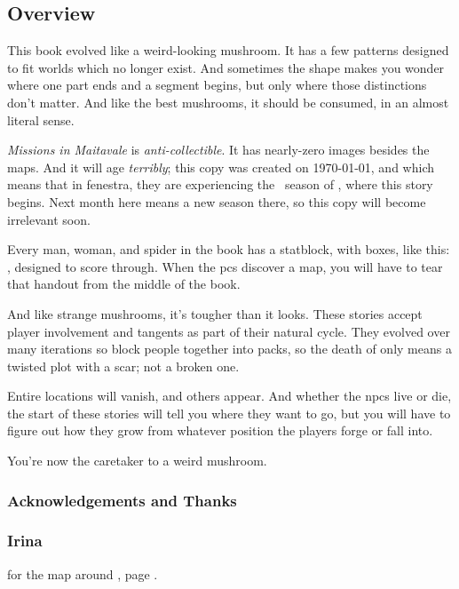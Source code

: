 \subsection*{Overview}

\begin{multicols}{2}

This book evolved like a weird-looking mushroom.
It has a few patterns designed to fit worlds which no longer exist.
And sometimes the shape makes you wonder where one part ends and a segment begins, but only where those distinctions don't matter.
And like the best mushrooms, it should be consumed, in an almost literal sense.

\textit{Missions in Maitavale} is \emph{anti-collectible}.
It has nearly-zero images besides the maps.
And it will age \emph{terribly}; this copy was created on \today, and which means that in \gls{fenestra}, they are experiencing the \showTemperature\ season of \showSeason, where this story begins.
Next month here means a new season there, so this copy will become irrelevant soon.

\randomdozen
Every man, woman, and spider in the book has a statblock, with  boxes, like this: \setcounter{wounds}{3} , designed to score through.
When the \glspl{pc} discover a map, you will have to tear that handout from the middle of the book.

And like strange mushrooms, it's tougher than it looks.
These stories accept player involvement and tangents as part of their natural cycle.
They evolved over many iterations so block people together into packs, so the death of  only means a twisted plot with a scar; not a broken one.

Entire locations will vanish, and others appear.
And whether the \glspl{npc} live or die, the start of these stories will tell you where they want to go, but you will have to figure out how they grow from whatever position the players forge or fall into.

You're now the caretaker to a weird mushroom.

\subsubsection*{Acknowledgements and Thanks}

\subsubsection*{Irina}
for the map around , page \pageref{Irina/greylands}.


\end{multicols}
